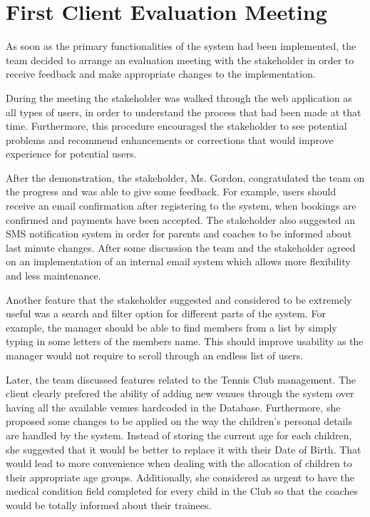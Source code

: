 \documentclass{l3proj}
\begin{document}
\section{First Client Evaluation Meeting}
As soon as the primary functionalities of the system had been implemented, the team decided to arrange an evaluation meeting with the stakeholder in order to receive feedback and make appropriate changes to the implementation.\\
\par 
During the meeting the stakeholder was walked through the web application as all types of users, in order to understand the process that had been made at that time. Furthermore, this procedure encouraged the stakeholder to see potential problems and recommend enhancements or corrections that would improve experience for potential users.\\
\par 
After the demonstration, the stakeholder, Ms. Gordon, congratulated the team on the progress and was able to give some feedback. For example, users should receive an email confirmation after registering to the system, when bookings are confirmed and payments have been accepted. The stakeholder also suggested an SMS notification system in order for parents and coaches to be informed about last minute changes. After some discussion the team and the stakeholder agreed on an implementation of an internal email system which allows more flexibility and less maintenance.\\
\par 
Another feature that the stakeholder suggested and considered to be extremely useful was a search and filter option for different parts of the system. For example, the manager should be able to find members from a list by simply typing in some letters of the members name. This should improve usability as the manager would not require to scroll through an endless list of users.\\
\par 
Later, the team discussed features related to the Tennis Club management. The client clearly prefered the ability of adding new venues through the system over having all the available venues hardcoded in the Database. Furthermore, she proposed some changes to be applied on the way the children's personal details are handled by the system. Instead of storing the current age for each children, she suggested that it would be better to replace it with their Date of Birth. That would lead to more convenience when dealing with the allocation of children to their appropriate age groups. Additionally, she considered as urgent to have the medical condition field completed for every child in the Club so that the coaches would be totally informed about their trainees.\\
\end{document}

